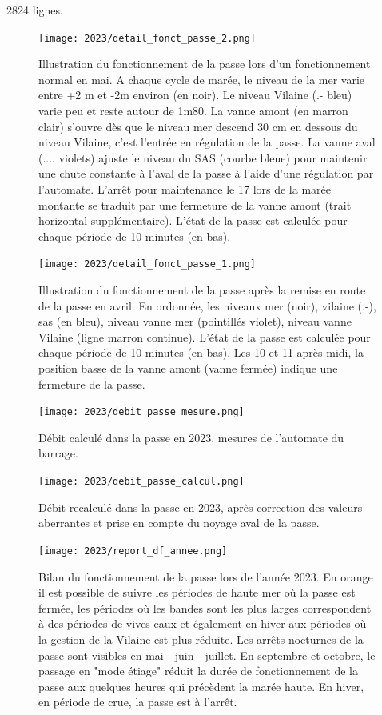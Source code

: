 \documentclass[11pt,twocolumn,titlepage,twoside]{article}\usepackage[]{graphicx}\usepackage[]{color}
\begin{document}
\textcolor{orange_EV}{\num{2824}} lignes.
\begin{figure}[htpb]
\centering
\texttt{[image: 2023/detail\_fonct\_passe\_2.png]}
\caption{Illustration du fonctionnement de la passe lors d'un fonctionnement
normal en mai. A chaque cycle de marée, le niveau de la mer varie entre +2 m et
-2m environ (en noir). Le niveau Vilaine (.- bleu) varie peu et reste
autour de 1m80. La vanne amont (en marron clair) s'ouvre  dès que le niveau mer
descend 30 cm en dessous du niveau Vilaine, c'est l'entrée en régulation de la
passe. La vanne aval (.... violets) ajuste le niveau du SAS (courbe bleue)
pour maintenir une chute constante à l'aval de la passe à l'aide d'une
régulation par l'automate. 
 L'arrêt pour maintenance le 17 lors de la marée montante se traduit par une
 fermeture de la vanne amont (trait horizontal supplémentaire). L'état de la
 passe est calculée pour chaque période de 10 minutes (en bas).
}
\label{detail_fonct_passe_2}
\end{figure}


\begin{figure}[htpb]
\centering
\texttt{[image: 2023/detail\_fonct\_passe\_1.png]}
\caption{Illustration du fonctionnement de la passe après la remise en route
de la passe en avril. En ordonnée, les niveaux mer (noir), vilaine
(.-), sas (en bleu), niveau vanne mer (pointillés violet), niveau vanne Vilaine (ligne marron
continue). L'état de la passe est calculée pour chaque période de 10 minutes (en bas).
Les 10 et 11 après midi, la position basse de la vanne amont (vanne fermée)
indique une fermeture de la passe.}
\label{detail_fonct_passe_1}
\end{figure}


\begin{figure}[ht]
\centering
\texttt{[image: 2023/debit\_passe\_mesure.png]}
\caption{Débit calculé dans la passe en 2023, mesures de l'automate du barrage.}
\label{debit_passe_mesure}
\end{figure}


\begin{figure}[ht]
\centering
\texttt{[image: 2023/debit\_passe\_calcul.png]}
\caption{Débit recalculé dans la passe en 2023, après correction des valeurs
aberrantes et prise en compte du noyage aval de la passe.}
\label{debit_passe_calcul}
\end{figure}


\begin{figure}[hp]
\centering
\texttt{[image: 2023/report\_df\_annee.png]} 
\caption{Bilan du fonctionnement de la passe lors de l'année 2023. En orange
il est possible de suivre les périodes de haute mer où la passe est fermée, les
périodes où les bandes sont les plus larges correspondent à des périodes de
vives eaux et également en hiver aux périodes où la gestion de la
Vilaine est plus réduite. Les arrêts nocturnes de la passe sont visibles en mai
- juin - juillet. En septembre et octobre, le passage en "mode étiage" réduit la
durée de fonctionnement de la passe aux quelques heures qui précèdent la marée
haute. En hiver, en période de crue, la passe est à l'arrêt.}
\label{report_df_annee}
\end{figure}
\end{document}
